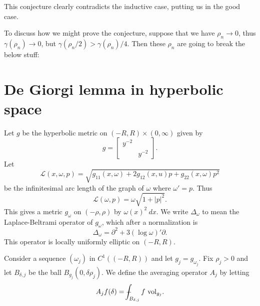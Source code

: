 \documentclass[reqno,12pt,letterpaper]{amsart}
\newcommand{\vol}{\mathrm{vol}}
\theoremstyle{definition}
\numberwithin{equation}{section}
\def\Xint#1{\mathchoice
{\XXint\displaystyle\textstyle{#1}}%
{\XXint\textstyle\scriptstyle{#1}}%
{\XXint\scriptstyle\scriptscriptstyle{#1}}%
{\XXint\scriptscriptstyle\scriptscriptstyle{#1}}%
\!\int}
\def\XXint#1#2#3{{\setbox0=\hbox{$#1{#2#3}{\int}$ }
\vcenter{\hbox{$#2#3$ }}\kern-.6\wd0}}
\def\dashint{\Xint-}
\begin{document}
This conjecture clearly contradicts the inductive case, putting us in the good case.

To discuss how we might prove the conjecture, suppose that we have $\rho_n \to 0$, thus $\gamma(\rho_n) \to 0$, but $\gamma(\rho_n/2) > \gamma(\rho_n)/4$.
Then these $\rho_n$ are going to break the below stuff:

\section{De Giorgi lemma in hyperbolic space}
Let $g$ be the hyperbolic metric on $(-R, R) \times (0, \infty)$ given by
$$g = \begin{bmatrix}y^{-2} \\ & y^{-2}\end{bmatrix}.$$
Let
$$\mathscr L(x, \omega, p) = \sqrt{g_{11}(x, \omega) + 2g_{12}(x, u)p + g_{22}(x, \omega) p^2}$$
be the infinitesimal arc length of the graph of $\omega$ where $\omega' = p$.
Thus
$$\mathscr L(\omega, p) = \omega \sqrt{1 + |p|^2}.$$
This gives a metric $g_\omega$ on $(-\rho, \rho)$ by $\omega(x)^2 ~dx$.
We write $\Delta_\omega$ to mean the Laplace-Beltrami operator of $g_\omega$, which after a normalization is
$$\Delta_\omega = \partial^2 + 3(\log \omega)' \partial.$$
This operator is locally uniformly elliptic on $(-R, R)$.

Consider a sequence $(\omega_j)$ in $C^1((-R, R))$ and let $g_j = g_{\omega_j}$.
Fix $\rho_j > 0$ and let $B_{\delta,j}$ be the ball $B_{g_j}(0, \delta \rho_j)$.
We define the averaging operator $A_j$ by letting
$$A_jf(\delta) = \dashint_{B_{\delta,j}} f ~\vol_{g_j}.$$
\end{document}
